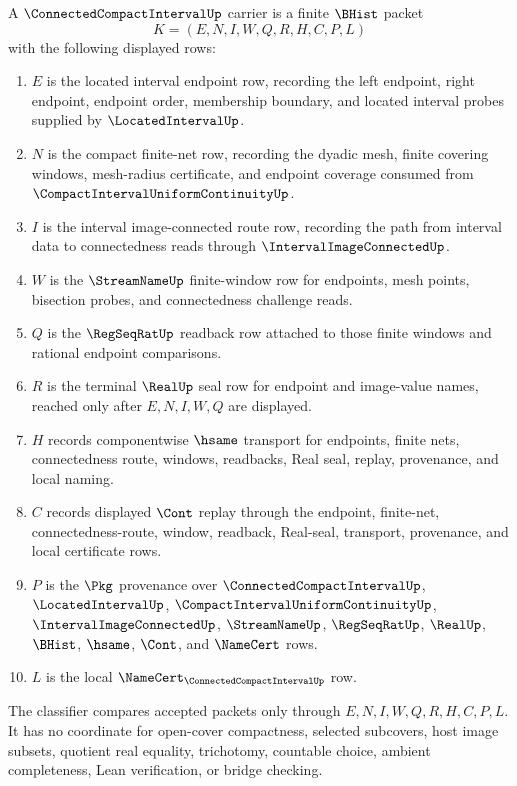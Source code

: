 \begin{definition}
\label{def:connected-compact-interval-carrier}
A $\ConnectedCompactIntervalUp$ carrier is a finite $\BHist$ packet
$$
K=(E,N,I,W,Q,R,H,C,P,L)
$$
with the following displayed rows:
\begin{enumerate}
\item $E$ is the located interval endpoint row, recording the left endpoint, right endpoint, endpoint order, membership boundary, and located interval probes supplied by $\LocatedIntervalUp$.
\item $N$ is the compact finite-net row, recording the dyadic mesh, finite covering windows, mesh-radius certificate, and endpoint coverage consumed from $\CompactIntervalUniformContinuityUp$.
\item $I$ is the interval image-connected route row, recording the path from interval data to connectedness reads through $\IntervalImageConnectedUp$.
\item $W$ is the $\StreamNameUp$ finite-window row for endpoints, mesh points, bisection probes, and connectedness challenge reads.
\item $Q$ is the $\RegSeqRatUp$ readback row attached to those finite windows and rational endpoint comparisons.
\item $R$ is the terminal $\RealUp$ seal row for endpoint and image-value names, reached only after $E,N,I,W,Q$ are displayed.
\item $H$ records componentwise $\hsame$ transport for endpoints, finite nets, connectedness route, windows, readbacks, Real seal, replay, provenance, and local naming.
\item $C$ records displayed $\Cont$ replay through the endpoint, finite-net, connectedness-route, window, readback, Real-seal, transport, provenance, and local certificate rows.
\item $P$ is the $\Pkg$ provenance over $\ConnectedCompactIntervalUp$, $\LocatedIntervalUp$, $\CompactIntervalUniformContinuityUp$, $\IntervalImageConnectedUp$, $\StreamNameUp$, $\RegSeqRatUp$, $\RealUp$, $\BHist$, $\hsame$, $\Cont$, and $\NameCert$ rows.
\item $L$ is the local $\NameCert_{\ConnectedCompactIntervalUp}$ row.
\end{enumerate}
The classifier compares accepted packets only through $E,N,I,W,Q,R,H,C,P,L$. It has no coordinate for open-cover compactness, selected subcovers, host image subsets, quotient real equality, trichotomy, countable choice, ambient completeness, Lean verification, or bridge checking.
\end{definition}

